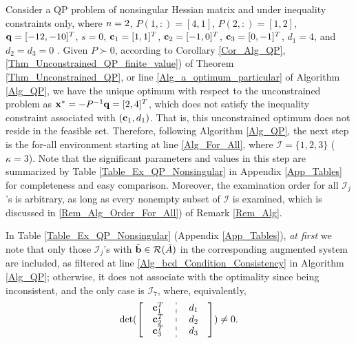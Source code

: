 \documentclass{imaman}
\newcommand{\beq}{\begin{eqnarray}}
\newcommand{\eeq}{\end{eqnarray}}
\newcommand{\bfb}{{\bf b}}
\newcommand{\bfc}{{\bf c}}
\newcommand{\bfx}{{\bf x}}
\newcommand{\bfq}{{\bf q}}
\newcommand{\calI}{{\mathcal I}}
\newcommand{\calR}{{\mathcal R}}
\newcommand{\itn}{{\it n}}
\numberwithin{equation}{section}
\begin{document}
\vspace{-0.1cm}
\begin{example}
Consider a QP problem of nonsingular Hessian matrix and under inequality constraints only, where $\itn=2$, $P(1,:)=[4,1]$, $P(2,:)=[1,2]$, $\bfq=[-12,-10]^T$, $s=0$, $\bfc_1=[1,1]^T$, $\bfc_2=[-1,0]^T$, $\bfc_3=[0,-1]^T$, $d_1=4$, and $d_2=d_3=0$ \citep{Lu(Ye):03(16)}. Given $P\succ 0$, according to Corollary \ref{Cor_Alg_QP}, \ref{Thm_Unconstrained_QP_finite_value}) of Theorem \ref{Thm_Unconstrained_QP}, or line \ref{Alg_a_optimum_particular} of Algorithm \ref{Alg_QP}, we have the unique optimum with respect to the unconstrained problem as $\bfx^*=-P^{-1}\bfq=[2,4]^T$, which does not satisfy the inequality constraint associated with $(\bfc_1,d_1)$. That is, this unconstrained optimum does not reside in the feasible set. Therefore, following Algorithm \ref{Alg_QP}, the next step is the for-all environment starting at line \ref{Alg_For_All}, where $\calI=\{1,2,3\}$ ($\kappa=3$). Note that the significant parameters and values in this step are summarized by Table \ref{Table_Ex_QP_Nonsingular} in Appendix \ref{App_Tables} for completeness and easy comparison. Moreover, the examination order for all $\calI_j$'s is arbitrary, as long as every nonempty subset of $\calI$ is examined, which is discussed in \ref{Rem_Alg_Order_For_All}) of Remark \ref{Rem_Alg}.

In Table \ref{Table_Ex_QP_Nonsingular} (Appendix \ref{App_Tables}), \textit{at first} we note that only those $\calI_j$'s with $\tilde\bfb\in\calR(\tilde A)$ in the corresponding augmented system are included, as filtered at line \ref{Alg_bcd_Condition_Consistency} in Algorithm \ref{Alg_QP}; otherwise, it does not associate with the optimality since being inconsistent, and the only case is $\calI_7$, where, equivalently,
\newpage\noindent\beq
\mbox{det}(\left[\def\arraystretch{1} \begin{array}{c:c}
\begin{array}{c} \bfc_1^T~\\ \bfc_2^T~\\ \bfc_3^T~ \end{array} &
\begin{array}{c} ~d_1\\ ~d_2 \\ ~d_3 \end{array} \end{array}\right])\ne 0.\nonumber
\eeq


\end{example}
\end{document}
